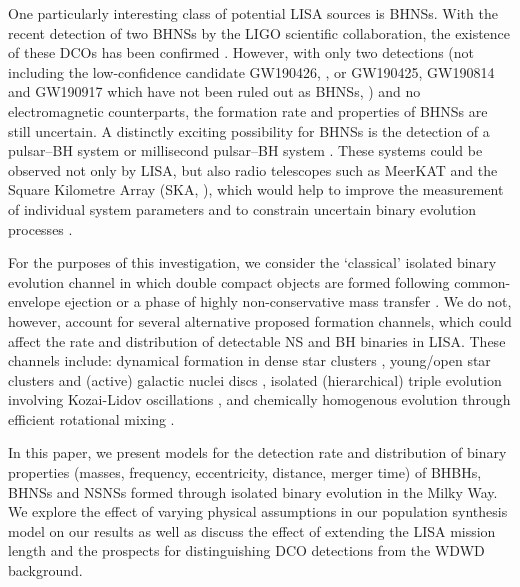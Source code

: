 One particularly interesting class of potential LISA sources is BHNSs. With the recent detection of two BHNSs by the LIGO scientific collaboration, the existence of these DCOs has been confirmed \citep{TheLIGOScientificCollaboration+2021}. However, with only two detections (not including the low-confidence candidate GW190426, \citealt{Abbott+2020_GWTC2}, or GW190425, GW190814 and GW190917 which have not been ruled out as BHNSs, \citealt{Abbott+2020_GW190425,Abbott+2020_GW190814, GWTC_2_1}) and no electromagnetic counterparts, the formation rate and properties of BHNSs are still uncertain. A distinctly exciting possibility for BHNSs is the detection of a pulsar--BH system or millisecond pulsar--BH system \citep{Narayan+1991, Pol+2021}. These systems could be observed not only by LISA, but also radio telescopes such as MeerKAT and the Square Kilometre Array (SKA, \citealt{Dewdney+2009}), which would help to improve the measurement of individual system parameters and to constrain uncertain binary evolution processes \citep[e.g.][]{Pfahl+2005,Chattopadhyay+2020}. 

For the purposes of this investigation, we consider the `classical' isolated binary evolution channel \citep[e.g.][]{Tutukov+1973,Tutukov+1993,Smarr+1976,Srinivasan+1989,Kalogera+2007,Belczynski+2016} in which double compact objects are formed following common-envelope ejection or a phase of highly non-conservative mass transfer \citep{Heuvel+2011, vandenHeuvel+2017}. We do not, however, account for several alternative proposed formation channels, which could affect the rate and distribution of detectable NS and BH binaries in LISA. These channels include: dynamical formation in dense star clusters \citep[e.g.][]{Sigurdsson+1993,PortegiesZwart+2000,Miller+2009,Rodriguez+2015}, young/open star clusters \citep[e.g.][]{Ziosi+2014, DiCarlo+2020, Banerjee+2020, Rastello+2020, Rastello+2021} and (active) galactic nuclei discs \citep[e.g.][]{Morris+1993, Antonini+2016, McKernan+2020}, isolated (hierarchical) triple evolution involving Kozai-Lidov oscillations \citep[e.g.][]{Stephan+2016, Silsbee+2017,Antonini+2017, Toonen+2020},  and chemically homogenous evolution through efficient rotational mixing \citep[e.g.][]{deMink+2009,Mandel+2016,Marchant+2016,Marchant+2017,duBuisson+2020}.

In this paper, we present models for the detection rate and distribution of binary properties (masses, frequency, eccentricity, distance, merger time) of BHBHs, BHNSs and NSNSs formed through isolated binary evolution in the Milky Way. We explore the effect of varying physical assumptions in our population synthesis model on our results as well as discuss the effect of extending the LISA mission length and the prospects for distinguishing DCO detections from the WDWD background.

